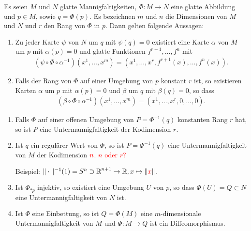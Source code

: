 \begin{Satz}\label{satz-3-4}
  Es seien $M$ und $N$ glatte Mannigfaltigkeiten, $\Phi \colon M \to N$ eine glatte Abbildung und $p \in M$, sowie $q = \Phi(p)$. Es bezeichnen $m$ und $n$ die Dimensionen von $M$ und $N$ und $r$ den Rang von $\Phi$ in $p$. Dann gelten folgende Aussagen:
  \begin{enumerate}[label=(\roman*),leftmargin=*,widest=ii]
  \item Zu jeder Karte $\psi$ von $N$ um $q$ mit $\psi(q) = 0$ existiert eine Karte $\alpha$ von $M$ um $p$ mit $\alpha(p) = 0$ und glatte Funktionen $f^{r+1},\ldots,f^n$ mit
    \begin{align*}
      \left(\psi \circ \Phi \circ \alpha^{-1}\right)\left(x^1,\ldots, x^m\right) = \left(x^1, \ldots, x^{r}, f^{r+1}(x), \ldots, f^n(x)\right).
    \end{align*}
  \item Falls der Rang von $\Phi$ auf einer Umgebung von $p$ konstant $r$ ist, so existieren Karten $\alpha$ um $p$ mit $\alpha(p) = 0$ und $\beta$ um $q$ mit $\beta(q) = 0$, so dass
    \begin{align*}
      \left(\beta \circ \Phi \circ \alpha^{-1}\right)\left(x^1, \ldots, x^m\right) = \left(x^1, \ldots, x^r, 0, \ldots, 0\right).
    \end{align*}
  \end{enumerate}
\end{Satz} 

\begin{Kor}
  \begin{enumerate}[label=(\roman*),widest=iii,leftmargin=*]
  \item Falls $\Phi$ auf einer offenen Umgebung von $P = \Phi^{-1}(q)$ konstanten Rang $r$ hat, so ist $P$ eine Untermannigfaltigkeit der Kodimension $r$.
  \item Ist $q$ ein regulärer Wert von $\Phi$, so ist $P = \Phi^{-1}(q)$ eine Untermannigfaltigkeit von $M$ der Kodimension $\textcolor{red}{n}$. \textcolor{red}{$n$ oder $r$?}
  
    Beispiel: $\|\cdot\|^{-1}(1) = S^n \supset \operatorname{\mathbb{R}}^{n+1} \to \operatorname{\mathbb{R}}, x \mapsto \|\textcolor{red}{x}\|$.
  \item Ist $\Phi_{*p}$ injektiv, so existiert eine Umgebung $U$ von $p$, so dass $\Phi(U) = Q \subset N$ eine Untermannigfaltigkeit von $N$ ist.
  \item Ist $\Phi$ eine Einbettung, so ist $Q = \Phi(M)$ eine $m$-dimensionale Untermannigfaltigkeit von $M$ und $\Phi \colon M \to Q$ ist ein Diffeomorphismus.
  \end{enumerate}
\end{Kor}

